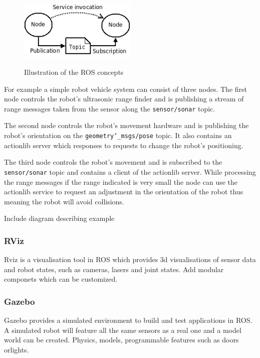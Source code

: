 \documentclass{mproj}
\begin{document}
\begin{figure}[h]
  \caption{Illustration of the ROS concepts}
  \centering
  \includegraphics[width=0.5\textwidth]{images/ROS_basic_concepts.png}
  \label{fig:ROS diagram}
\end{figure}

For example a simple robot vehicle system can consist of three nodes. The first node controls the robot's ultrasonic range finder and is publishing a stream of range messages taken from the sensor along the \texttt{sensor/sonar} topic.

The second node controls the robot's movement hardware and is publishing the robot's orientation on the \texttt{geometry\char`_msgs/pose} topic. It also contains an actionlib server which responses to requests to change the robot's positioning. 

The third node controls the robot's movement and is subscribed to the \texttt{sensor/sonar} topic and contains a client of the actionlib server. While processing the range messages if the range indicated is very small the node can use the actionlib service to request an adjustment in the orientation of the robot thus meaning the robot will avoid collisions. 

Include diagram describing example


\subsubsection{RViz}

Rviz is a visualisation tool in ROS which provides 3d visualisations of sensor data and robot states, such as cameras, lasers and joint states. Add modular componets which can be customized.

\subsubsection{Gazebo}
Gazebo provides a simulated environment to build and test applications in ROS. A simulated robot will feature all the same sensors as a real one and a model world can be created. Physics, models, programmable features such as doors orlights.
\end{document}
